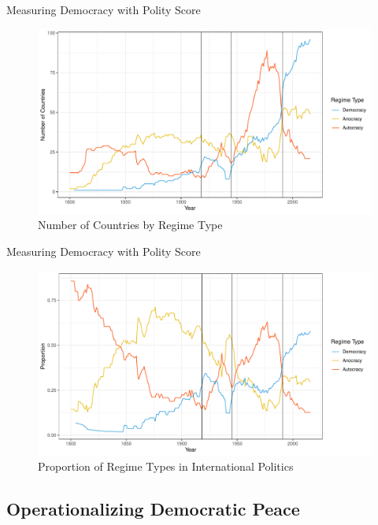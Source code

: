 \documentclass{beamer}
\begin{document}
	\begin{frame}{Measuring Democracy with Polity Score}
		\begin{figure}
			\includegraphics[width=\linewidth]{data/output/plots/polity_cnt.pdf}
			\caption{Number of Countries by Regime Type}
		\end{figure}
	\end{frame}

	\begin{frame}{Measuring Democracy with Polity Score}
		\begin{figure}
			\includegraphics[width=\linewidth]{data/output/plots/polity_prp.pdf}
			\caption{Proportion of Regime Types in International Politics}
			\label{polity_proportion}
		\end{figure}
	\end{frame}
	
	\subsection{Operationalizing Democratic Peace}
	
\end{document}
